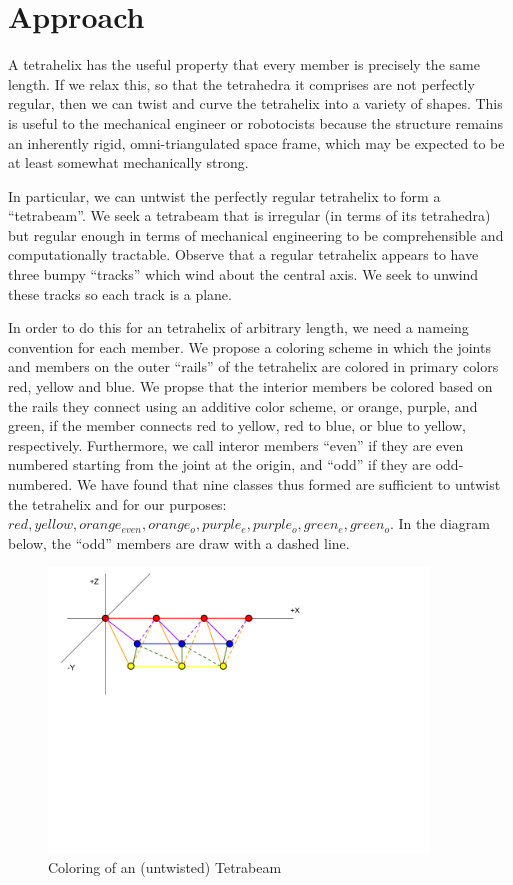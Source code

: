 \documentclass[11pt]{article}
\begin{document}
\section{Approach}

A tetrahelix has the useful property that every member is precisely the same length. If we relax this, so that the tetrahedra it
comprises are not perfectly regular, then we can twist and curve the tetrahelix into a variety of shapes. This is useful to
the mechanical engineer or robotocists because the structure remains an inherently rigid, omni-triangulated space frame, which
may be expected to be at least somewhat mechanically strong.

In particular, we can untwist the perfectly regular tetrahelix to form a ``tetrabeam''. We seek a tetrabeam that is irregular
(in terms of its tetrahedra) but regular enough in terms of mechanical engineering to be comprehensible and computationally tractable.
Observe that a regular tetrahelix appears to have three bumpy ``tracks'' which wind about the central axis.  We seek to unwind
these tracks so each track is a plane.

In order to do this for an tetrahelix of arbitrary length, we need a nameing convention for each member. We propose a coloring
scheme in which the joints and members on the outer ``rails'' of the tetrahelix are colored in primary colors red, yellow and blue.
We propse that the interior members be colored based on the rails they connect using an additive color scheme, or orange, purple, and green,
if the member connects red to yellow, red to blue, or blue to yellow, respectively.  Furthermore, we call interor members ``even'' if they
are even numbered starting from the joint at the origin, and ``odd'' if they are odd-numbered.  We have found that nine classes thus
formed are sufficient to untwist the tetrahelix and for our purposes: $red, yellow, orange_{even}, orange_o, purple_e, purple_o, green_e, green_o$. In the diagram below, the ``odd'' members are draw with a dashed line.


 \begin{figure}[H]
     \centering
     \includegraphics[width=0.9\textwidth]{TetrahelixColoringDiagram.png}
     \caption{Coloring of an (untwisted) Tetrabeam}
 \end{figure}
\end{document}
